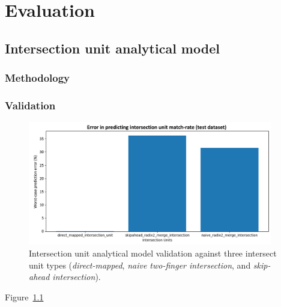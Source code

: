 \chapter{Evaluation}
\label{chapter:evaluation}

\section{Intersection unit analytical model}

\subsection{Methodology}



\subsection{Validation}

\begin{figure}[ht]
    \centering
    \includegraphics[width=0.95\textwidth]{figures/isect_test_error.png}
    \caption{Intersection unit analytical model validation against three intersect unit types (\textit{direct-mapped}, \textit{naive two-finger intersection}, and \textit{skip-ahead intersection}).}
    \label{fig:isect_test_error}
\end{figure}

Figure~\ref{fig:isect_test_error} 